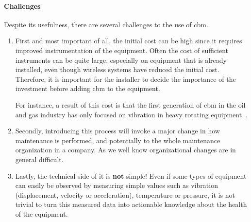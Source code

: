 \paragraph{Challenges}
Despite its usefulness, there are several challenges to the use of \acl{cbm}.
\begin{enumerate}
    \item First and most important of all, the initial cost can be high since it requires improved instrumentation of the equipment.
          Often the cost of sufficient instruments can be quite large, especially on equipment that is already installed, even though
          wireless systems have reduced the initial cost. Therefore, it is important for the installer to decide the importance of the investment before adding \ac*{cbm} to the equipment.

          For instance, a result of this cost is that the first generation of \ac*{cbm} in the oil and gas industry has only focused on vibration in heavy rotating equipment~\cite{Misc:dida_2020_manufacturing}.
    \item Secondly, introducing this process will invoke a major change in how maintenance is performed, and potentially to the whole maintenance organization in a company.
          As we well know organizational changes are in general difficult.
    \item Lastly, the technical side of it is \textbf{not} simple! Even if some types of equipment can easily be observed by measuring simple
          values such as vibration (displacement, velocity or acceleration), temperature or pressure, it is not trivial to turn this measured data
          into actionable knowledge about the health of the equipment.
\end{enumerate}

